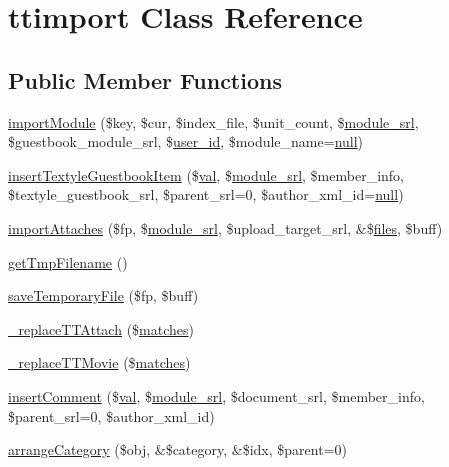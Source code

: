 \hypertarget{classttimport}{}\section{ttimport Class Reference}
\label{classttimport}
\subsection*{Public Member Functions}
\begin{DoxyCompactItemize}
\item 
\hyperlink{classttimport_a9b625191007ff2039b86e7dc770ba3e9}{import\+Module} (\$key, \$cur, \$index\+\_\+file, \$unit\+\_\+count, \$\hyperlink{ko_8install_8php_a370bb6450fab1da3e0ed9f484a38b761}{module\+\_\+srl}, \$guestbook\+\_\+module\+\_\+srl, \$\hyperlink{ko_8install_8php_a74f1a394389d774e5b4cd5d1d15413f7}{user\+\_\+id}, \$module\+\_\+name=\hyperlink{modernizr_8min_8js_a286f9ec831c5e676eeb493248eab9575}{null})
\item 
\hyperlink{classttimport_a617885a3204e6697e3e6c681377c4e89}{insert\+Textyle\+Guestbook\+Item} (\$\hyperlink{ckeditor_2js_2xe__interface_8js_a4fb96abdf073a439bca5e051c333b35d}{val}, \$\hyperlink{ko_8install_8php_a370bb6450fab1da3e0ed9f484a38b761}{module\+\_\+srl}, \$member\+\_\+info, \$textyle\+\_\+guestbook\+\_\+srl, \$parent\+\_\+srl=0, \$author\+\_\+xml\+\_\+id=\hyperlink{modernizr_8min_8js_a286f9ec831c5e676eeb493248eab9575}{null})
\item 
\hyperlink{classttimport_a8b585ce5c93947bd9a4a1f6240c55f58}{import\+Attaches} (\$fp, \$\hyperlink{ko_8install_8php_a370bb6450fab1da3e0ed9f484a38b761}{module\+\_\+srl}, \$upload\+\_\+target\+\_\+srl, \&\$\hyperlink{popup_8min_8js_a0742cac2750bccc2d88ac080fb9daa22}{files}, \$buff)
\item 
\hyperlink{classttimport_aa122afd62b775486ec56276e96ad7ddb}{get\+Tmp\+Filename} ()
\item 
\hyperlink{classttimport_a1b234f17517d13e725bfd53d17f4debd}{save\+Temporary\+File} (\$fp, \$buff)
\item 
\hyperlink{classttimport_a14327afa66ec130f1a0be24a7b5c7160}{\+\_\+replace\+T\+T\+Attach} (\$\hyperlink{jquery_8mobile_8customized_8min_8js_a0dd9fb10d0da7ad1a1c71aad2c6388f7}{matches})
\item 
\hyperlink{classttimport_a30eac1bf295a9bfd0a7bc60292a07f06}{\+\_\+replace\+T\+T\+Movie} (\$\hyperlink{jquery_8mobile_8customized_8min_8js_a0dd9fb10d0da7ad1a1c71aad2c6388f7}{matches})
\item 
\hyperlink{classttimport_a44b3596d067ce3a7321537829a1df835}{insert\+Comment} (\$\hyperlink{ckeditor_2js_2xe__interface_8js_a4fb96abdf073a439bca5e051c333b35d}{val}, \$\hyperlink{ko_8install_8php_a370bb6450fab1da3e0ed9f484a38b761}{module\+\_\+srl}, \$document\+\_\+srl, \$member\+\_\+info, \$parent\+\_\+srl=0, \$author\+\_\+xml\+\_\+id)
\item 
\hyperlink{classttimport_a988c2841f6e8e28be78ce8f9eed7e57d}{arrange\+Category} (\$obj, \&\$category, \&\$idx, \$parent=0)
\end{DoxyCompactItemize}
